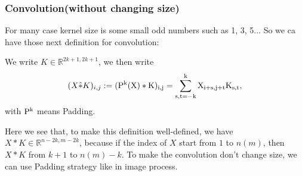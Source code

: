 \subsubsection{Convolution(without changing size)}
For many case kernel size is some small odd numbers such as 1, 3, 5... So we ca have those next definition for convolution:
\begin{definition}

We write $K\in \mathbb R^{2k+1, 2k+1}$, we then write
\begin{equation}\label{ConvPadding}
(X \hat{\ast} K)_{i,j} := (\rm{P}^k(X) \ast K)_{i,j} = \sum_{s, t = -k}^k X_{i + s, j + t} K_{s,t},
\end{equation}
with $\rm{P}^k$ means Padding. 
\end{definition}
Here we see that, to make this definition well-defined, we have $X\ast K \in \mathbb{R}^{n-2k, m-2k}$, because if the index of $X$ start from $1$ to $n(m)$, then $X \ast K$ from $k+1$ to $n(m) - k$. To make the convolution don't change size, we can use Padding strategy like in image process. 
